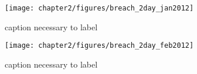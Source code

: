 \begin{figure}[tbh]
	\texttt{[image: chapter2/figures/breach\_2day\_jan2012]} \caption{caption necessary to label} \label{fig:ctdBreachJan12}
\end{figure}

\begin{figure}[tbh]
	\texttt{[image: chapter2/figures/breach\_2day\_feb2012]} \caption{caption necessary to label} \label{fig:ctdBreachFeb12}
\end{figure}

